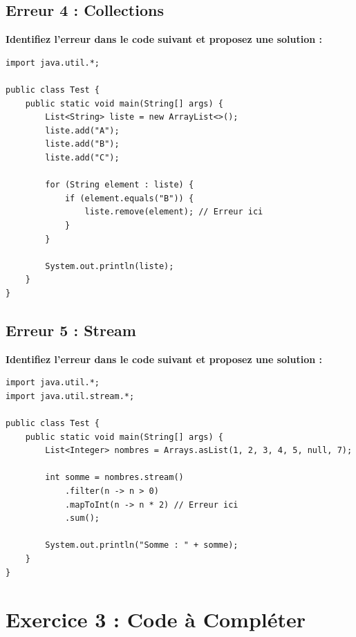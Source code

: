 \documentclass[11pt,a4paper]{article}
\begin{document}
\subsection{Erreur 4 : Collections}

\textbf{Identifiez l'erreur dans le code suivant et proposez une solution :}

\begin{lstlisting}
import java.util.*;

public class Test {
    public static void main(String[] args) {
        List<String> liste = new ArrayList<>();
        liste.add("A");
        liste.add("B");
        liste.add("C");
        
        for (String element : liste) {
            if (element.equals("B")) {
                liste.remove(element); // Erreur ici
            }
        }
        
        System.out.println(liste);
    }
}
\end{lstlisting}

\begin{reponsebox}
\vspace{5cm}
\end{reponsebox}

\subsection{Erreur 5 : Stream}

\textbf{Identifiez l'erreur dans le code suivant et proposez une solution :}

\begin{lstlisting}
import java.util.*;
import java.util.stream.*;

public class Test {
    public static void main(String[] args) {
        List<Integer> nombres = Arrays.asList(1, 2, 3, 4, 5, null, 7);
        
        int somme = nombres.stream()
            .filter(n -> n > 0)
            .mapToInt(n -> n * 2) // Erreur ici
            .sum();
        
        System.out.println("Somme : " + somme);
    }
}
\end{lstlisting}

\begin{reponsebox}
\vspace{5cm}
\end{reponsebox}

\newpage

\section{Exercice 3 : Code à Compléter}
\end{document}
